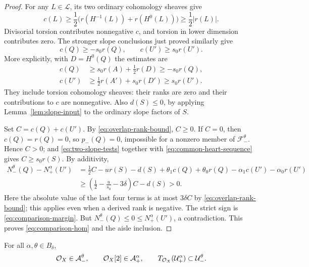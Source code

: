 \begin{proof}
For any $L\in\mathcal L$, its two ordinary cohomology sheaves give
\begin{equation}\label{eq:overlap-rank-bound}
 c(L)\geq\frac12\bigl(r(H^{-1}(L))+r(H^0(L))\bigr)
                                     \geq\frac12|r(L)|.
\end{equation}
Divisorial torsion contributes nonnegative $c$, and torsion in lower
dimension contributes zero.  The stronger slope conclusions just
proved similarly give
\begin{equation}\label{eq:two-slope-tests}
          c(Q)\geq-s_0r(Q),\qquad c(U')\geq s_0r(U').
\end{equation}
More explicitly, with $D=H^0(Q)$ the estimates are
\[
 \begin{split}
 c(Q)&\geq s_0r(A)+\tfrac12r(D)\geq-s_0r(Q),\\
 c(U')&\geq\tfrac12r(A')+s_0r(D')\geq s_0r(U').
 \end{split}
\]
They include torsion cohomology sheaves: their ranks are zero and
their contributions to $c$ are nonnegative.  Also $d(S)\leq0$, by applying
Lemma~\ref{lem:slope-input} to the ordinary slope factors of $S$.

Set $C=c(Q)+c(U')$.  By \eqref{eq:overlap-rank-bound}, $C\geq0$.
If $C=0$, then $c(Q)=r(Q)=0$, so $p_-(Q)=0$, impossible for a
nonzero member of $\mathcal F_-^\theta$.  Hence $C>0$; and
\eqref{eq:two-slope-tests} together with
\eqref{eq:common-heart-sequence} gives $C\geq s_0r(S)$.
By additivity,
\begin{align*}
 N_-^\theta(Q)-N_+^\alpha(U')
 &=\frac12 C-u r(S)-d(S)
       +\theta_1c(Q)+\theta_0r(Q)-\alpha_1c(U')-\alpha_0r(U')\\
 &\geq \left(\frac12-\frac{u}{s_0}-3\delta\right)C-d(S)>0.
\end{align*}
Here the absolute value of the last four terms is at most $3\delta C$
by \eqref{eq:overlap-rank-bound}; this applies even when a derived
rank is negative.  The strict sign is \eqref{eq:comparison-margin}.
But $N_-^\theta(Q)\leq0\leq N_+^\alpha(U')$, a contradiction.
This proves \eqref{eq:comparison-hom} and the aisle inclusion.
\end{proof}

\begin{lemma}\label{lem:twist-aisle}
For all $\alpha,\theta\in B_\delta$,
\[
 \mathcal O_X\in\mathcal A_-^\theta,\qquad
 \mathcal O_X[2]\in\mathcal A_+^\alpha,\qquad
 T_{\mathcal O_X}(\mathcal U_+^\alpha)\subset\mathcal U_-^\theta.
\]
\end{lemma}

